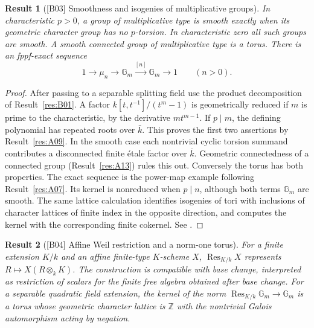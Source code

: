 \documentclass[11pt,a4paper,openany,oneside]{book}
\theoremstyle{resultstyle}
\newtheorem{statement}{Result}[chapter]
\newenvironment{result}[2]{\clubpenalty=10000\begin{statement}[\textnormal{[#1]} #2]\leavevmode\label{res:#1}\ignorespaces}{\end{statement}}
\theoremstyle{definition}
\numberwithin{equation}{chapter}
\begin{document}
\begin{result}{B03}{Smoothness and isogenies of multiplicative groups}
In characteristic \(p>0\), a group of multiplicative type is smooth
exactly when its geometric character group has no \(p\)-torsion.
In characteristic zero all such groups are smooth.
A smooth connected group of multiplicative type is a torus.
There is an fppf-exact sequence
\[
 1\longrightarrow \mu_n\longrightarrow\mathbb G_m
 \xrightarrow{[n]}\mathbb G_m\longrightarrow1
 \qquad(n>0).
\]
\end{result}

\begin{proof}
After passing to a separable splitting field use the product
decomposition of Result~\ref{res:B01}. A factor
\(k[t,t^{-1}]/(t^m-1)\) is geometrically reduced if \(m\) is prime
to the characteristic, by the derivative \(mt^{m-1}\).
If \(p\mid m\), the defining polynomial has repeated roots over
\(\bar k\). This proves the first two assertions by
Result~\ref{res:A09}. In the smooth case each nontrivial cyclic
torsion summand contributes a disconnected finite étale factor
over \(\bar k\). Geometric connectedness of a connected group
(Result~\ref{res:A13}) rules this out. Conversely the torus has
both properties. The exact sequence is the power-map example
following Result~\ref{res:A07}. Its kernel is nonreduced when
\(p\mid n\), although both terms \(\mathbb G_m\) are smooth.
The same lattice calculation identifies isogenies of tori with
inclusions of character lattices of finite index in the opposite
direction, and computes the kernel with the corresponding finite
cokernel. See \cite[Remark 12.5, Example 12.28 and
Theorems 12.30, 12.32--12.33]{milne}.
\end{proof}

\begin{result}{B04}{Affine Weil restriction and a norm-one torus}
For a finite extension \(K/k\) and an affine finite-type \(K\)-scheme
\(X\), \(\operatorname{Res}_{K/k}X\) represents
\(R\mapsto X(R\otimes_k K)\). The construction is compatible with base
change, interpreted as restriction of scalars for the finite free
algebra obtained after base change. For a separable quadratic field
extension, the kernel of the norm
\(\operatorname{Res}_{K/k}\mathbb G_m\to\mathbb G_m\) is a torus
whose geometric character lattice is \(\mathbb Z\) with the nontrivial
Galois automorphism acting by negation.
\end{result}
\end{document}

